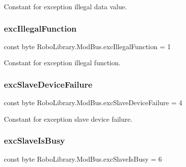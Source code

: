 Constant for exception illegal data value.

\hypertarget{class_robo_library_1_1_mod_bus_a7d880ad2a5e4f294d9ce80ab4b201894}{}\label{class_robo_library_1_1_mod_bus_a7d880ad2a5e4f294d9ce80ab4b201894} 
\subsubsection{\texorpdfstring{exc\+Illegal\+Function}{excIllegalFunction}}
{\footnotesize\ttfamily const byte Robo\+Library.\+Mod\+Bus.\+exc\+Illegal\+Function = 1}



Constant for exception illegal function.

\hypertarget{class_robo_library_1_1_mod_bus_a23f40b9de42b38035088cf579e960c59}{}\label{class_robo_library_1_1_mod_bus_a23f40b9de42b38035088cf579e960c59} 
\subsubsection{\texorpdfstring{exc\+Slave\+Device\+Failure}{excSlaveDeviceFailure}}
{\footnotesize\ttfamily const byte Robo\+Library.\+Mod\+Bus.\+exc\+Slave\+Device\+Failure = 4}



Constant for exception slave device failure.

\hypertarget{class_robo_library_1_1_mod_bus_a3057571657af1e777174499c9203aee8}{}\label{class_robo_library_1_1_mod_bus_a3057571657af1e777174499c9203aee8} 
\subsubsection{\texorpdfstring{exc\+Slave\+Is\+Busy}{excSlaveIsBusy}}
{\footnotesize\ttfamily const byte Robo\+Library.\+Mod\+Bus.\+exc\+Slave\+Is\+Busy = 6}



